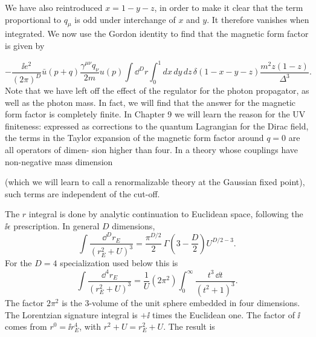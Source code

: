 We have also reintroduced $x=1-y-z$, in order to make it clear that the term
proportional to $q_\mu$ is odd under interchange of $x$ and $y$. It therefore vanishes when
integrated. We now use the Gordon identity to find that the magnetic form factor is
given by

\begin{equation}
  -\frac{\ii e^2}{(2\pi)^D}\bar u(p+q)\frac{\gamma^{\mu\nu}q_\nu}{2m}u(p)
  \int \dd^D r\int_0^1dx\,dy\,dz\,\delta(1-x-y-z)
  \frac{m^2z(1-z)}{\Delta^3}.
  \label{eq:6.17}
\end{equation}
Note that we have left off the effect of the regulator for the photon propagator, as
well as the photon mass. In fact, we will find that the answer for the magnetic form
factor is completely finite. In Chapter 9 we will learn the reason for the UV finiteness:
expressed as corrections to the quantum Lagrangian for the Dirac field, the terms in the
Taylor expansion of the magnetic form factor around $q=0$ are all operators of dimen-
sion higher than four. In a theory whose couplings have non-negative mass dimension

(which we will learn to call a renormalizable theory at the Gaussian fixed point), such
terms are independent of the cut-off.

The $r$ integral is done by analytic continuation to Euclidean space, following the $\ii\epsilon$
prescription. In general $D$ dimensions,
\begin{equation*}
  \int\frac{\dd^D r_E}{(r_E^2+U)^3}
  =\frac{\pi^{D/2}}{2}\,\Gamma\!\left(3-\frac D2\right)U^{D/2-3}.
\end{equation*}
For the $D=4$ specialization used below this is
\begin{equation*}
  \int\frac{\dd^4r_E}{(r_E^2+U)^3}
  =\frac1U(2\pi^2)\int_0^\infty\frac{t^3\,\dd t}{(t^2+1)^3}.
\end{equation*}
The factor $2\pi^2$ is the 3-volume of the unit sphere embedded in four dimensions. The
Lorentzian signature integral is $+\ii$ times the Euclidean one. The factor of $\ii$ comes from
$r^0=\ii r_E^4$, with $r^2+U=r_E^2+U$. The result is

